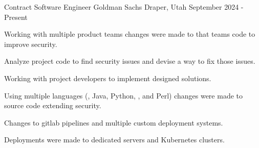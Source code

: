 
\begin{cventries}
\cventry
{Contract Software Engineer} %
{Goldman Sachs} %
{Draper, Utah} %
{September 2024 - Present} %
{
	\begin{cvitems} %
		\item {Working with multiple product teams changes were made to that teams code to improve security.}
		\item {Analyze project code to find security issues and devise a way to fix those issues.}
		\item {Working with project developers to implement designed solutions.}
		\item {Using multiple languages (\Csh, Java, Python, \Cpp, and Perl) changes were made to source code extending security.}
		\item {Changes to gitlab pipelines and multiple custom deployment systems.}
		\item {Deployments were made to dedicated servers and Kubernetes clusters.}
	\end{cvitems}
}



\end{cventries}
